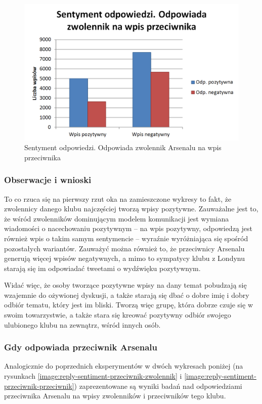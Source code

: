 \begin{figure}[ht!]
\centering
\includegraphics[width=120mm]{img/reply-sentiment-zwolennik-przeciwnik.png}
\caption{Sentyment odpowiedzi. Odpowiada zwolennik Arsenalu na wpis przeciwnika}
\label{image:reply-sentiment-zwolennik-przeciwnik}
\end{figure}



\subsubsection{Obserwacje i wnioski}
To co rzuca się na pierwszy rzut oka na zamieszczone wykresy to fakt, że 
zwolennicy danego klubu najczęściej tworzą wpisy pozytywne. Zauważalne jest to,
że wśród zwolenników dominującym modelem komunikacji jest wymiana wiadomości
o nacechowaniu pozytywnym -- na wpis pozytywny, odpowiedzą jest również wpis o 
takim samym sentymencie -- wyraźnie wyróżniająca się spośród pozostałych
wariantów.
Zauważyć można również to, że przeciwnicy Arsenalu generują więcej wpisów 
negatywnych, a mimo to sympatycy klubu z Londynu starają się im odpowiadać
tweetami o wydźwięku pozytywnym.

Widać więc, że osoby tworzące pozytywne wpisy na dany temat pobudzają się
wzajemnie do ożywionej dyskusji, a także starają się dbać o dobre imię
i dobry odbiór tematu, który jest im bliski. Tworzą więc grupę, która
dobrze czuje się w swoim towarzystwie, a także stara się kreować
pozytywny odbiór swojego ulubionego klubu na zewnątrz, wśród innych osób.

\subsubsection{Gdy odpowiada przeciwnik Arsenalu}
Analogicznie do poprzednich eksperymentów w dwóch wykresach poniżej (na 
rysunkach \ref{image:reply-sentiment-przeciwnik-zwolennik} i 
\ref{image:reply-sentiment-przeciwnik-przeciwnik}) zaprezentowane są
wyniki badań nad odpowiedziami przeciwnika Arsenalu na wpisy zwolenników
i przeciwników tego klubu.


